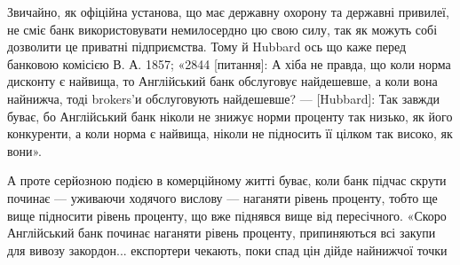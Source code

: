 Звичайно, як офіційна установа, що має державну охорону та державні
привилеї, не сміє банк використовувати немилосердно цю свою силу, так як
можуть собі дозволити це приватні підприємства. Тому й Hubbard ось що каже
перед банковою комісією В. А. 1857; «2844 [питання]: А хіба не правда, що
коли норма дисконту є найвища, то Англійський банк обслуговує найдешевше,
а коли вона найнижча, тоді brokers’и обслуговують найдешевше? — [Hubbard]:
Так завжди буває, бо Англійський банк ніколи не знижує норми проценту так
низько, як його конкуренти, а коли норма є найвища, ніколи не підносить її
цілком так високо, як вони».

А проте серйозною подією в комерційному житті буває, коли банк підчас
скрути починає — уживаючи ходячого вислову — наганяти рівень проценту, тобто
ще вище підносити рівень проценту, що вже піднявся вище від пересічного. «Скоро
Англійський банк починає наганяти рівень проценту, припиняються всі закупи
для вивозу закордон... експортери чекають, поки спад цін дійде найнижчої точки
\parbreak{}  %
